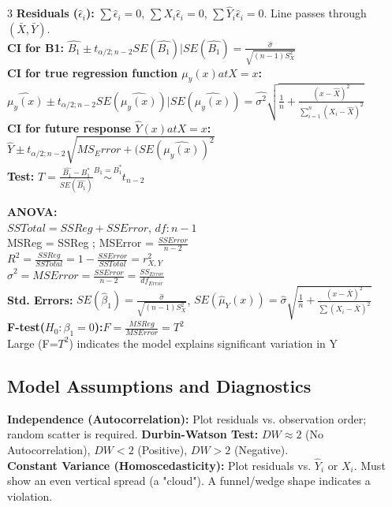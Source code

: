 \documentclass[10pt]{article}
\begin{document}
\begin{multicols}{3}
\textbf{Residuals ($\hat{\epsilon}_i$):} $\sum \hat{\epsilon}_i = 0$, \quad $\sum X_i \hat{\epsilon}_i = 0$, \quad $\sum \hat{Y}_i \hat{\epsilon}_i = 0$. Line passes through $(\bar{X}, \bar{Y})$.\\
\textbf{CI for B1:} $\hat{B_1} \pm t_{\alpha/2;n-2}SE(\hat{B_1}) | SE(\hat{B_1}) = \frac{\hat{\sigma}}{{\sqrt{(n-1)S_X^2}}}$\\
\textbf{CI for true regression function $\mu_y(x) at X=x$:}\\
$\hat{\mu_y(x)} \pm t_{\alpha/2;n-2}SE(\hat{\mu_y(x)}) | SE(\hat{\mu_y(x)}) = \hat{\sigma^2} \sqrt{\frac{1}{n} + \frac{(x-\hat{X})^2}{\sum_{i=1}^{n}(X_i - \hat{X})^2}}$\\
\textbf{CI for future response $\hat{Y}(x) at X=x$:}\\
$\hat{Y} \pm t_{\alpha/2;n-2}\sqrt{MS_Error + (SE(\hat{\mu_y(x)})^2} $\\
\textbf{Test:} $T = \frac{\hat{B_1} - B_1^*}{SE(\hat{B_1})} \overset{B_1 = B_1^*}{\sim}t_{n-2}$

\textbf{ANOVA:}\\
$SSTotal = SSReg + SSError$, $df: n-1$\\
MSReg = SSReg ; MSError = $\frac{SSError}{n-2}$\\
$R^2 = \frac{SSReg}{SSTotal} = 1 - \frac{SSError}{SSTotal}=r^2_{X,Y}$\\ 
$\hat{\sigma}^2 = MSError = \frac{SSError}{n-2}=\frac{SS_{Error}}{df_{Error}}$\\
\textbf{Std. Errors:} $SE(\hat{\beta}_1) = \frac{\hat{\sigma}}{\sqrt{(n-1)S_X^2}}$, \quad $SE(\hat{\mu}_Y(x)) = \hat{\sigma}\sqrt{\frac{1}{n} + \frac{(x - \bar{X})^2}{\sum(X_i - \bar{X})^2}}$\\
\textbf{F-test($H_0:\beta_1=0$):}$F = \frac{MSReg}{MSError} = T^2$\\
Large (F=$T^2$) indicates the model explains significant variation in Y

\subsection*{Model Assumptions and Diagnostics}

\textbf{Independence (Autocorrelation):} Plot residuals vs. observation order; random scatter is required. 
\textbf{Durbin-Watson Test:} $DW \approx 2$ (No Autocorrelation), $DW < 2$ (Positive), $DW > 2$ (Negative). \\

\textbf{Constant Variance (Homoscedasticity):} Plot residuals vs. $\hat{Y}_i$ or $X_i$. Must show an even vertical spread (a "cloud"). A funnel/wedge shape indicates a violation. \\


\end{multicols}
\end{document}
